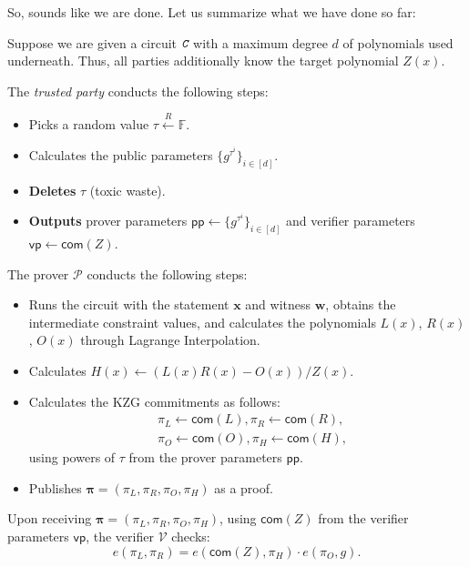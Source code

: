 \documentclass[../lecture-notes.tex]{subfiles}
\begin{document}
So, sounds like we are done. Let us summarize what we have done so far:
\begin{tcolorbox}[breakable, title=Attempt \#1: Non-sound SNARK Protocol,
    colback=blue!5!white,
    colframe=blue!75!black,
    colbacktitle=blue!25!white,
    coltitle=blue!20!black,
    fonttitle=\bfseries,
    boxrule=1.25pt,
    subtitle style={boxrule=0pt,
    colback=blue!20!white,
    colupper=blue!75!gray} ]

    Suppose we are given a circuit $\textit{\texttt{C}}$ with a maximum degree $d$ of polynomials used underneath. Thus, all parties additionally know the target polynomial $Z(x)$.

    The \emph{trusted party} conducts the following steps:
    \begin{itemize}[label=, left=0mm]
        \item Picks a random value $\tau \xleftarrow{R} \mathbb{F}$.
        \item Calculates the public parameters $\{g^{\tau^i}\}_{i \in [d]}$.
        \item \textbf{Deletes} $\tau$ (toxic waste).
        \item \textbf{Outputs} prover parameters $\mathsf{pp} \gets \{g^{\tau^i}\}_{i \in [d]}$ and verifier parameters $\mathsf{vp} \gets \mathsf{com}(Z)$.
    \end{itemize}
    The prover $\mathcal{P}$ conducts the following steps:
    \begin{itemize}[label=, left=0mm]
        \item Runs the circuit with the statement $\mathbf{x}$ and witness $\mathbf{w}$, obtains the intermediate constraint values, and calculates the polynomials $L(x)$, $R(x)$, $O(x)$ through Lagrange Interpolation.
        \item Calculates $H(x) \gets (L(x)R(x) - O(x))\big/ Z(x)$.
        \item Calculates the KZG commitments as follows: 
        \begin{equation*}
            \begin{aligned}
                &\pi_L \gets \mathsf{com}(L), \pi_R \gets \mathsf{com}(R), \\ &\pi_O \gets \mathsf{com}(O), \pi_H \gets \mathsf{com}(H),                
            \end{aligned}
        \end{equation*}
        using powers of $\tau$ from the prover parameters $\mathsf{pp}$.
        \item Publishes $\boldsymbol{\pi} = (\pi_L,\pi_R,\pi_O,\pi_H)$ as a proof.
    \end{itemize}
    Upon receiving $\boldsymbol{\pi} = (\pi_L,\pi_R,\pi_O,\pi_H)$, using $\mathsf{com}(Z)$ from the verifier parameters $\mathsf{vp}$, the verifier $\mathcal{V}$ checks:
    \begin{equation*}
        e(\pi_L, \pi_R) = e(\mathsf{com}(Z), \pi_H) \cdot e(\pi_O, g).
    \end{equation*}
\end{tcolorbox}
\end{document}
